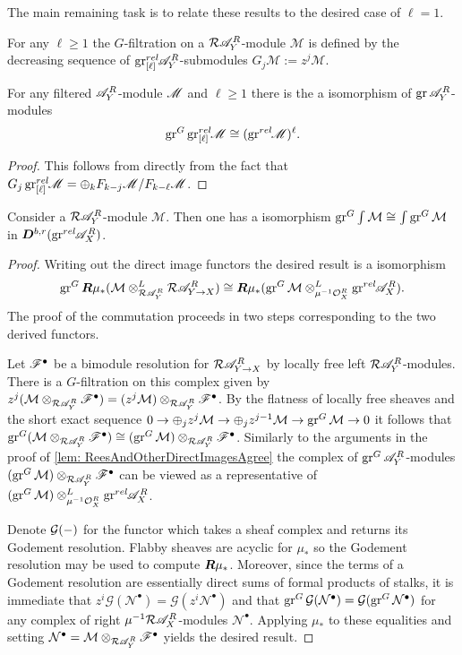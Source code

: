 The main remaining task is to relate these results to the desired case of $\ell = 1$.
\begin{definition}
  For any $\ell \geq 1$ the $G$-filtration on a $\mathcal{R}\mathscr{A}_Y^R$-module $\mathcal{M}$ is defined by the decreasing sequence of $\operatorname{gr}_{[\ell]}^{rel}\mkern-5mu\mathscr{A}_Y^R$-submodules $G_j \mathcal{M} := z^{j}\mathcal{M}$.
\end{definition}
\begin{lemma}\label{lem: GradedGGradedLYieldsGraded}
  For any filtered $\mathscr{A}_Y^R$-module $\mathscr{M}$ and $\ell \geq 1$ there is the a isomorphism of $\operatorname{gr} \mathscr{A}_Y^R$-modules
  $$\operatorname{gr}^G \operatorname{gr}_{[\ell]}^{rel}\mkern-5mu \mathscr{M} \cong (\operatorname{gr}^{rel}\mkern-5mu\mathscr{M})^\ell.$$
\end{lemma}
\begin{proof}
  This follows from directly from the fact that $G_j\operatorname{gr}_{[\ell]}^{rel}\mkern-5mu\mathscr{M} = \oplus_k F_{k-j}\mathscr{M} /F_{k-\ell}\mathscr{M}$.
\end{proof}
\begin{lemma}\label{lem: grGCommutes}
  Consider a $\mathcal{R}\mathscr{A}_Y^R$-module $\mathcal{M}$. Then one has a isomorphism $\operatorname{gr}^G\int\mathcal{M} \cong \int\operatorname{gr}^G\mathcal{M}$ in $\boldsymbol{D}^{b,r}(\operatorname{gr}^{rel}\mkern-5mu\mathscr{A}_X^R)$.
\end{lemma}
\begin{proof}
  Writing out the direct image functors the desired result is a isomorphism $$\operatorname{gr}^G\boldsymbol{R}\mu_*(\mathcal{M}\otimes^L_{\mathcal{R}\mathscr{A}_Y^R} \mathcal{R}\mathscr{A}_{Y\to X}^R)  \cong \boldsymbol{R}\mu_*(\operatorname{gr}^G\mathcal{M}\otimes^L_{\mu^{-1}\mathcal{O}_X^R}\operatorname{gr}^{rel}\mkern-5mu\mathscr{A}_X^R).$$
  The proof of the commutation proceeds in two steps corresponding to the two derived functors.

  Let $\mathscr{F}^\bullet$ be a bimodule resolution for $\mathcal{R}\mathscr{A}_{Y\to X}^R$ by locally free left $\mathcal{R} \mathscr{A}_Y^R$-modules.
  There is a $G$-filtration on this complex given by $z^j(\mathcal{M}\otimes_{\mathcal{R}\mathscr{A}_Y^R} \mathscr{F}^\bullet) = (z^j\mathcal{M})\otimes_{\mathcal{R}\mathscr{A}_Y^R} \mathscr{F}^\bullet$.
  By the flatness of locally free sheaves and the short exact sequence $0\to \oplus_j z^j \mathcal{M} \to \oplus_j z^{j-1}\mathcal{M} \to \operatorname{gr}^G \mathcal{M} \to 0$ it follows that $\operatorname{gr}^G(\mathcal{M}\otimes_{\mathcal{R}\mathscr{A}_Y^R} \mathscr{F}^\bullet) \cong (\operatorname{gr}^G\mathcal{M})\otimes_{\mathcal{R}\mathscr{A}_Y^R} \mathscr{F}^\bullet$.
  Similarly to the arguments in the proof of \cref{lem: ReesAndOtherDirectImagesAgree} the complex of $\operatorname{gr}^G\mathscr{A}_Y^R$-modules  $(\operatorname{gr}^G\mathcal{M})\otimes_{\mathcal{R}\mathscr{A}_Y^R} \mathscr{F}^\bullet$ can be viewed as a representative of $(\operatorname{gr}^G\mathcal{M})\otimes^L_{\mu^{-1}\mathcal{O}_X^R}\operatorname{gr}^{rel}\mkern-5mu\mathscr{A}_X^R$.

  Denote $\mathcal{G}({-})$ for the functor which takes a sheaf complex and returns its Godement resolution.
  Flabby sheaves are acyclic for $\mu_*$ so the Godement resolution may be used to compute $\boldsymbol{R}\mu_*$.
  Moreover, since the terms of a Godement resolution are essentially direct sums of formal products of stalks, it is immediate that $z^i \mathcal{G}(\mathcal{N}^\bullet) = \mathcal{G}(z^i\mathcal{N}^\bullet)$ and that $\operatorname{gr}^G\mathcal{G}(\mathcal{N}^\bullet) =\mathcal{G}(\operatorname{gr}^G\mathcal{N}^\bullet)$ for any complex of right $\mu^{-1}\mathcal{R}\mathscr{A}_X^R$-modules $\mathcal{N}^\bullet$.
  Applying $\mu_*$ to these equalities and setting $\mathcal{N}^\bullet = \mathcal{M}\otimes_{\mathcal{R}\mathscr{A}_Y^R} \mathscr{F}^\bullet$ yields the desired result.
\end{proof}
